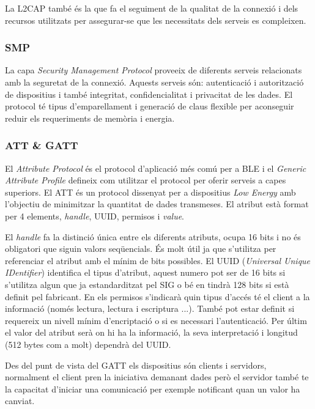 La L2CAP també és la que fa el seguiment de la qualitat de la connexió i dels recursos utilitzats per assegurar-se que les necessitats dels serveis es compleixen.

\subsubsection{SMP}
La capa \textit{Security Management Protocol} proveeix de diferents serveis relacionats amb la seguretat de la connexió.
Aquests serveis són: autenticació i autorització de dispositius i també integritat, confidencialitat i privacitat de les dades.
El protocol té tipus d'emparellament i generació de claus flexible per aconseguir reduir els requeriments de memòria i energia.

\subsubsection{ATT \& GATT}
El \textit{Attribute Protocol} és el protocol d'aplicació més comú per a BLE i el \textit{Generic Attribute Profile} defineix com utilitzar el protocol per oferir serveis a capes superiors.
El ATT és un protocol dissenyat per a dispositius \textit{Low Energy} amb l'objectiu de minimitzar la quantitat de dades transmeses. El atribut està format per 4 elements, \textit{handle}, UUID, permisos  i \textit{value}.

El \textit{handle} fa la distinció única entre els diferents atributs, ocupa 16 bits i no és obligatori que siguin valors seqüencials. És molt útil ja que s'utilitza per referenciar el atribut amb el mínim de bits possibles.
El UUID (\textit{Universal Unique IDentifier}) identifica el tipus d'atribut, aquest numero pot ser de 16 bits si s'utilitza algun que ja estandarditzat pel SIG o bé en tindrà 128 bits si està definit pel fabricant.
En els permisos s'indicarà quin tipus d'accés té el client a la informació (només lectura, lectura i escriptura ...). També pot estar definit si requereix un nivell mínim d'encriptació o si es necessari l'autenticació.
Per últim el valor del atribut serà on hi ha la informació, la seva interpretació i longitud (512 bytes com a molt) dependrà del UUID.

Des del punt de vista del GATT els dispositius són clients i servidors, normalment el client pren la iniciativa demanant dades però el servidor també te la capacitat d'iniciar una comunicació per exemple notificant quan un valor ha canviat.

